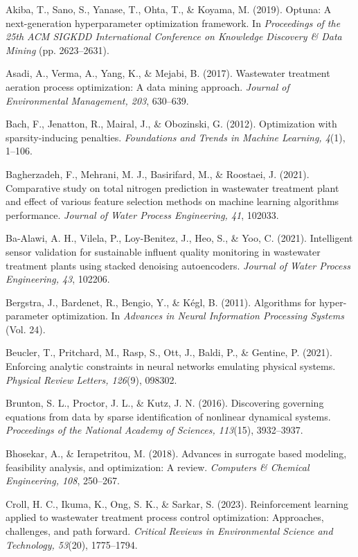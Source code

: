 \documentclass[a4paper,fleqn]{cas-sc}
\begin{document}
\noindent Akiba, T., Sano, S., Yanase, T., Ohta, T., \& Koyama, M. (2019). Optuna: A next-generation hyperparameter optimization framework. In \textit{Proceedings of the 25th ACM SIGKDD International Conference on Knowledge Discovery \& Data Mining} (pp. 2623--2631).

\noindent Asadi, A., Verma, A., Yang, K., \& Mejabi, B. (2017). Wastewater treatment aeration process optimization: A data mining approach. \textit{Journal of Environmental Management, 203}, 630--639.

\noindent Bach, F., Jenatton, R., Mairal, J., \& Obozinski, G. (2012). Optimization with sparsity-inducing penalties. \textit{Foundations and Trends in Machine Learning, 4}(1), 1--106.

\noindent Bagherzadeh, F., Mehrani, M. J., Basirifard, M., \& Roostaei, J. (2021). Comparative study on total nitrogen prediction in wastewater treatment plant and effect of various feature selection methods on machine learning algorithms performance. \textit{Journal of Water Process Engineering, 41}, 102033.

\noindent Ba-Alawi, A. H., Vilela, P., Loy-Benitez, J., Heo, S., \& Yoo, C. (2021). Intelligent sensor validation for sustainable influent quality monitoring in wastewater treatment plants using stacked denoising autoencoders. \textit{Journal of Water Process Engineering, 43}, 102206.

\noindent Bergstra, J., Bardenet, R., Bengio, Y., \& K\'egl, B. (2011). Algorithms for hyper-parameter optimization. In \textit{Advances in Neural Information Processing Systems} (Vol. 24).

\noindent Beucler, T., Pritchard, M., Rasp, S., Ott, J., Baldi, P., \& Gentine, P. (2021). Enforcing analytic constraints in neural networks emulating physical systems. \textit{Physical Review Letters, 126}(9), 098302.

\noindent Brunton, S. L., Proctor, J. L., \& Kutz, J. N. (2016). Discovering governing equations from data by sparse identification of nonlinear dynamical systems. \textit{Proceedings of the National Academy of Sciences, 113}(15), 3932--3937.

\noindent Bhosekar, A., \& Ierapetritou, M. (2018). Advances in surrogate based modeling, feasibility analysis, and optimization: A review. \textit{Computers \& Chemical Engineering, 108}, 250--267.

\noindent Croll, H. C., Ikuma, K., Ong, S. K., \& Sarkar, S. (2023). Reinforcement learning applied to wastewater treatment process control optimization: Approaches, challenges, and path forward. \textit{Critical Reviews in Environmental Science and Technology, 53}(20), 1775--1794.
\end{document}
